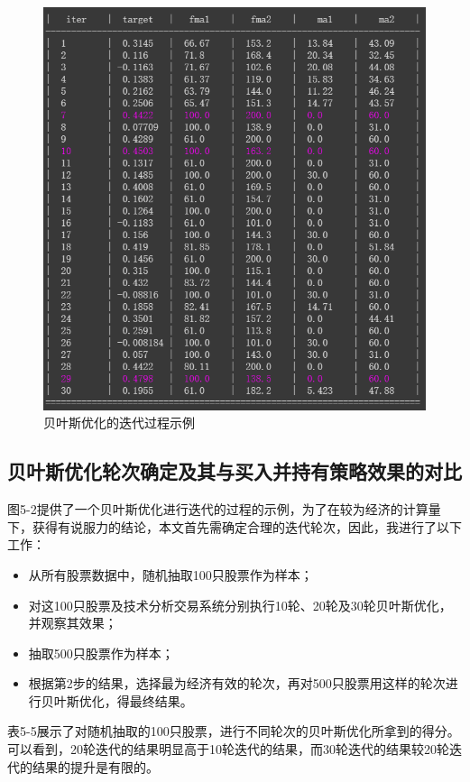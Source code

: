 \documentclass[twoside,longtitle]{LZUthesis}
\begin{document}
\begin{figure}[h]
    \centering
    \includegraphics[scale=0.9]{fig5-2.png}
    \caption{贝叶斯优化的迭代过程示例}
    \label{fig:my_label}
\end{figure}

\subsection{贝叶斯优化轮次确定及其与买入并持有策略效果的对比}
图5-2提供了一个贝叶斯优化进行迭代的过程的示例，为了在较为经济的计算量下，获得有说服力的结论，本文首先需确定合理的迭代轮次，因此，我进行了以下工作：
\begin{itemize}
    \item 从所有股票数据中，随机抽取100只股票作为样本；
    \item 对这100只股票及技术分析交易系统分别执行10轮、20轮及30轮贝叶斯优化，并观察其效果；
    \item 抽取500只股票作为样本；
    \item 根据第2步的结果，选择最为经济有效的轮次，再对500只股票用这样的轮次进行贝叶斯优化，得最终结果。
\end{itemize}

表5-5展示了对随机抽取的100只股票，进行不同轮次的贝叶斯优化所拿到的得分。可以看到，20轮迭代的结果明显高于10轮迭代的结果，而30轮迭代的结果较20轮迭代的结果的提升是有限的。
\end{document}

